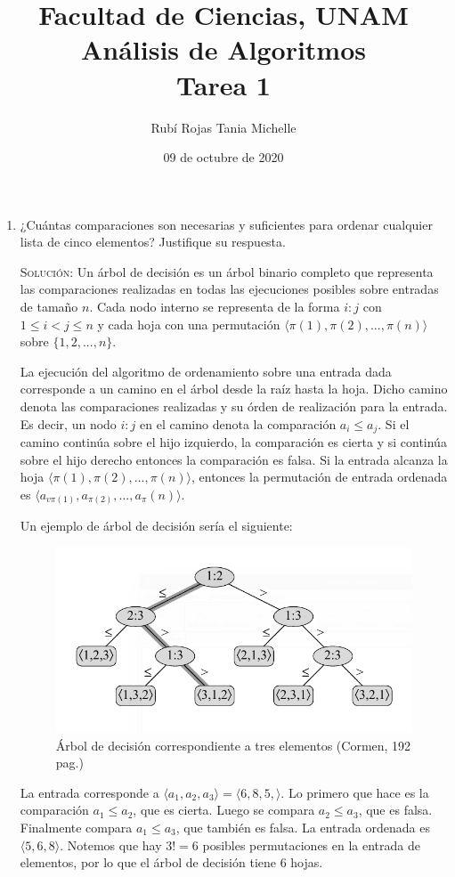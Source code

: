 \documentclass[letterpaper,11pt]{article}
\title{Facultad de Ciencias, UNAM \\ Análisis de Algoritmos \\ Tarea 1}
\author{Rubí Rojas Tania Michelle}
\date{09 de octubre de 2020}
\begin{document}
\maketitle

\begin{enumerate}
    \item ¿Cuántas comparaciones son necesarias y suficientes para ordenar 
    cualquier lista de cinco elementos? Justifique su respuesta.

    \textsc{Solución:} Un árbol de decisión es un árbol binario completo que 
    representa las comparaciones realizadas en todas las ejecuciones posibles 
    sobre entradas de tamaño $n$. Cada nodo interno se representa de la forma 
    $i:j$ con $1 \leq i < j \leq n$ y cada hoja con una permutación 
    $\langle \pi(1), \pi(2), ..., \pi(n) \rangle$ sobre $\{1, 2, ..., n\}$.

    La ejecución del algoritmo de ordenamiento sobre una entrada dada 
    corresponde a un camino en el árbol desde la raíz hasta la hoja. Dicho 
    camino denota las comparaciones realizadas y su órden de realización para 
    la entrada. Es decir, un nodo $i:j$ en el camino denota la comparación 
    $a_i \leq a_j$. Si el camino continúa sobre el hijo izquierdo, la
    comparación es cierta y si continúa sobre el hijo derecho entonces la 
    comparación es falsa. Si la entrada alcanza la hoja $\langle \pi(1), 
    \pi(2), ..., \pi(n) \rangle$, entonces la permutación de entrada ordenada 
    es $\langle a_{v\pi(1)}, a_{\pi(2)}, ..., a_\pi(n) \rangle$.

    Un ejemplo de árbol de decisión sería el siguiente:
    \begin{figure}[h]
        \centering
        \includegraphics[width=0.5\linewidth]{imagenes/decision-tree.png}
        \caption{Árbol de decisión correspondiente a tres elementos (Cormen, 
        192 pag.)}
        \label{fig:decision-tree}
    \end{figure}

    La entrada corresponde a $\langle a_1, a_2, a_3 \rangle = \langle 6, 8, 5, 
    \rangle$. Lo primero que hace es la comparación $a_1 \leq a_2$, que es 
    cierta. Luego se compara $a_2 \leq a_3$, que es falsa. Finalmente compara 
    $a_1 \leq a_3$, que también es falsa. La entrada ordenada es $\langle 5, 6, 
    8 \rangle$. Notemos que hay $3! = 6$ posibles permutaciones en la entrada 
    de elementos, por lo que el árbol de decisión tiene $6$ hojas.


\end{enumerate}
\end{document}
